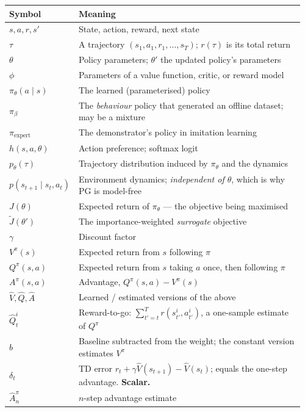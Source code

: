 \documentclass[11pt,a4paper]{article}
\begin{document}
\begin{center}
\begin{tabular}{@{}p{0.16\linewidth}p{0.80\linewidth}@{}}
\toprule
\textbf{Symbol} & \textbf{Meaning} \\
\midrule
$s,a,r,s'$ & State, action, reward, next state \\
$\tau$ & A trajectory $(s_1,a_1,r_1,\dots,s_T)$; $r(\tau)$ is its total return \\
$\theta$ & Policy parameters; $\theta'$ the updated policy's parameters \\
$\phi$ & Parameters of a value function, critic, or reward model \\
$\pi_\theta(a\mid s)$ & The learned (parameterised) policy \\
$\pi_\beta$ & The \emph{behaviour} policy that generated an offline dataset; may be a mixture \\
$\pi_{\text{expert}}$ & The demonstrator's policy in imitation learning \\
$h(s,a,\theta)$ & Action preference; softmax logit \\
$p_\theta(\tau)$ & Trajectory distribution induced by $\pi_\theta$ and the dynamics \\
$p(s_{t+1}\mid s_t,a_t)$ & Environment dynamics; \emph{independent of $\theta$}, which is why PG is model-free \\
$J(\theta)$ & Expected return of $\pi_\theta$ --- the objective being maximised \\
$\tilde J(\theta')$ & The importance-weighted \emph{surrogate} objective \\
$\gamma$ & Discount factor \\
$V^\pi(s)$ & Expected return from $s$ following $\pi$ \\
$Q^\pi(s,a)$ & Expected return from $s$ taking $a$ once, then following $\pi$ \\
$A^\pi(s,a)$ & Advantage, $Q^\pi(s,a)-V^\pi(s)$ \\
$\hat V,\hat Q,\hat A$ & Learned / estimated versions of the above \\
$\hat Q^i_t$ & Reward-to-go: $\sum_{t'=t}^{T}r(s^i_{t'},a^i_{t'})$, a one-sample estimate of $Q^\pi$ \\
$b$ & Baseline subtracted from the weight; the constant version estimates $V^\pi$ \\
$\delta_t$ & TD error $r_t+\gamma\hat V(s_{t+1})-\hat V(s_t)$; equals the one-step advantage. \textbf{Scalar.} \\
$\hat A^\pi_n$ & $n$-step advantage estimate \\

\end{tabular}
\end{center}
\end{document}
